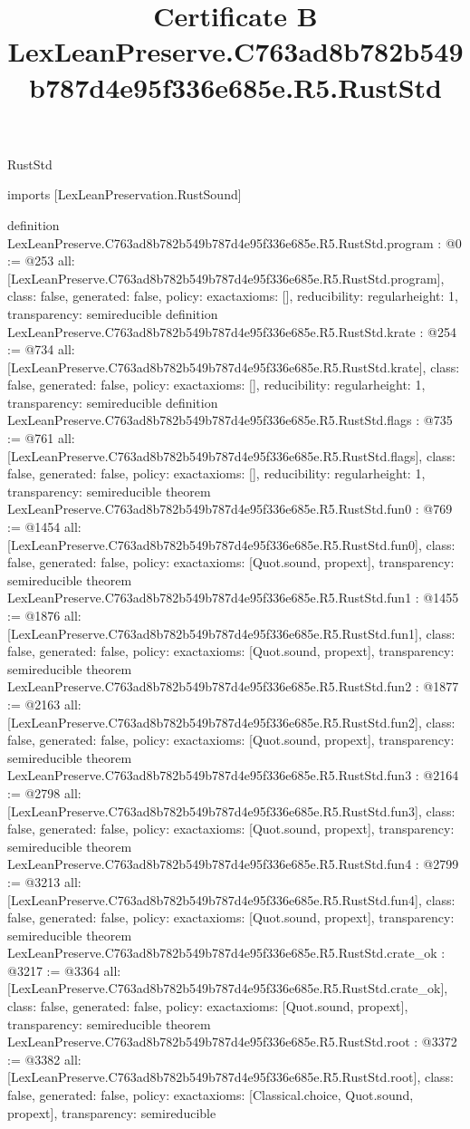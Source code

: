 \begin{lexlean}{RustStd}
\title{Certificate B LexLeanPreserve.C763ad8b782b549b787d4e95f336e685e.R5.RustStd}
\begin{coremodule}
imports [LexLeanPreservation.RustSound]

definition LexLeanPreserve.C763ad8b782b549b787d4e95f336e685e.R5.RustStd.program : @0 := @253 {
  all: [LexLeanPreserve.C763ad8b782b549b787d4e95f336e685e.R5.RustStd.program],
  class: false,
  generated: false,
  policy: exact{axioms: []},
  reducibility: regular{height: 1},
  transparency: semireducible
}
definition LexLeanPreserve.C763ad8b782b549b787d4e95f336e685e.R5.RustStd.krate : @254 := @734 {
  all: [LexLeanPreserve.C763ad8b782b549b787d4e95f336e685e.R5.RustStd.krate],
  class: false,
  generated: false,
  policy: exact{axioms: []},
  reducibility: regular{height: 1},
  transparency: semireducible
}
definition LexLeanPreserve.C763ad8b782b549b787d4e95f336e685e.R5.RustStd.flags : @735 := @761 {
  all: [LexLeanPreserve.C763ad8b782b549b787d4e95f336e685e.R5.RustStd.flags],
  class: false,
  generated: false,
  policy: exact{axioms: []},
  reducibility: regular{height: 1},
  transparency: semireducible
}
theorem LexLeanPreserve.C763ad8b782b549b787d4e95f336e685e.R5.RustStd.fun0 : @769 := @1454 {
  all: [LexLeanPreserve.C763ad8b782b549b787d4e95f336e685e.R5.RustStd.fun0],
  class: false,
  generated: false,
  policy: exact{axioms: [Quot.sound, propext]},
  transparency: semireducible
}
theorem LexLeanPreserve.C763ad8b782b549b787d4e95f336e685e.R5.RustStd.fun1 : @1455 := @1876 {
  all: [LexLeanPreserve.C763ad8b782b549b787d4e95f336e685e.R5.RustStd.fun1],
  class: false,
  generated: false,
  policy: exact{axioms: [Quot.sound, propext]},
  transparency: semireducible
}
theorem LexLeanPreserve.C763ad8b782b549b787d4e95f336e685e.R5.RustStd.fun2 : @1877 := @2163 {
  all: [LexLeanPreserve.C763ad8b782b549b787d4e95f336e685e.R5.RustStd.fun2],
  class: false,
  generated: false,
  policy: exact{axioms: [Quot.sound, propext]},
  transparency: semireducible
}
theorem LexLeanPreserve.C763ad8b782b549b787d4e95f336e685e.R5.RustStd.fun3 : @2164 := @2798 {
  all: [LexLeanPreserve.C763ad8b782b549b787d4e95f336e685e.R5.RustStd.fun3],
  class: false,
  generated: false,
  policy: exact{axioms: [Quot.sound, propext]},
  transparency: semireducible
}
theorem LexLeanPreserve.C763ad8b782b549b787d4e95f336e685e.R5.RustStd.fun4 : @2799 := @3213 {
  all: [LexLeanPreserve.C763ad8b782b549b787d4e95f336e685e.R5.RustStd.fun4],
  class: false,
  generated: false,
  policy: exact{axioms: [Quot.sound, propext]},
  transparency: semireducible
}
theorem LexLeanPreserve.C763ad8b782b549b787d4e95f336e685e.R5.RustStd.crate_ok : @3217 := @3364 {
  all: [LexLeanPreserve.C763ad8b782b549b787d4e95f336e685e.R5.RustStd.crate_ok],
  class: false,
  generated: false,
  policy: exact{axioms: [Quot.sound, propext]},
  transparency: semireducible
}
theorem LexLeanPreserve.C763ad8b782b549b787d4e95f336e685e.R5.RustStd.root : @3372 := @3382 {
  all: [LexLeanPreserve.C763ad8b782b549b787d4e95f336e685e.R5.RustStd.root],
  class: false,
  generated: false,
  policy: exact{axioms: [Classical.choice, Quot.sound, propext]},
  transparency: semireducible
}


\end{coremodule}
\end{lexlean}
